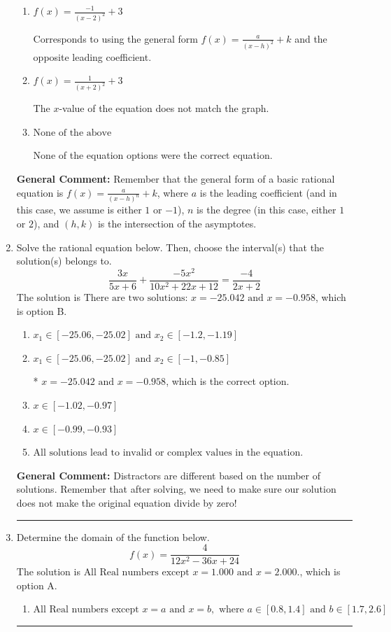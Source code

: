 \documentclass{extbook}[14pt]
\newcommand{\litem}[1]{\item #1

\rule{\textwidth}{0.4pt}}
\begin{document}
\begin{enumerate}
{\begin{enumerate}[label=\Alph*.]
Corresponds to thinking the graph was a shifted version of $\frac{1}{x}$.
\item \( f(x) = \frac{-1}{(x - 2)^2} + 3 \)

Corresponds to using the general form $f(x) = \frac{a}{(x-h)^2}+k$ and the opposite leading coefficient.
\item \( f(x) = \frac{1}{(x + 2)^2} + 3 \)

The $x$-value of the equation does not match the graph.
\item \( \text{None of the above} \)

None of the equation options were the correct equation.
\end{enumerate}

\textbf{General Comment:} Remember that the general form of a basic rational equation is $ f(x) = \frac{a}{(x-h)^n} + k$, where $a$ is the leading coefficient (and in this case, we assume is either $1$ or $-1$), $n$ is the degree (in this case, either $1$ or $2$), and $(h, k)$ is the intersection of the asymptotes.
}
\litem{
Solve the rational equation below. Then, choose the interval(s) that the solution(s) belongs to.
\[ \frac{3x}{5x + 6} + \frac{-5x^{2}}{10x^{2} +22 x + 12} = \frac{-4}{2x + 2} \]The solution is \( \text{There are two solutions: } x = -25.042 \text{ and } x = -0.958 \), which is option B.\begin{enumerate}[label=\Alph*.]
\item \( x_1 \in [-25.06, -25.02] \text{ and } x_2 \in [-1.2,-1.19] \)


\item \( x_1 \in [-25.06, -25.02] \text{ and } x_2 \in [-1,-0.85] \)

* $x = -25.042 \text{ and } x = -0.958$, which is the correct option.
\item \( x \in [-1.02,-0.97] \)


\item \( x \in [-0.99,-0.93] \)


\item \( \text{All solutions lead to invalid or complex values in the equation.} \)


\end{enumerate}

\textbf{General Comment:} Distractors are different based on the number of solutions. Remember that after solving, we need to make sure our solution does not make the original equation divide by zero!
}
\litem{
Determine the domain of the function below.
\[ f(x) = \frac{4}{12x^{2} -36 x + 24} \]The solution is \( \text{All Real numbers except } x = 1.000 \text{ and } x = 2.000. \), which is option A.\begin{enumerate}[label=\Alph*.]
\item \( \text{All Real numbers except } x = a \text{ and } x = b, \text{ where } a \in [0.8, 1.4] \text{ and } b \in [1.7, 2.6] \)


\end{enumerate}}
\end{enumerate}
\end{document}
